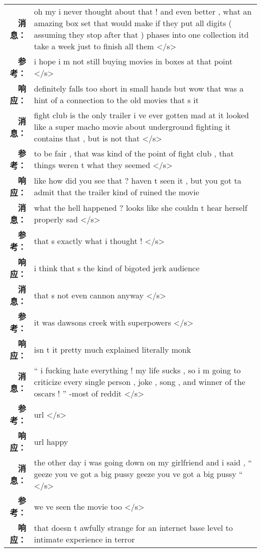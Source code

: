 \begin{tabularx}{\textwidth}{@{}rX@{}}%
\toprule%
\midrule%
\textbf{消息：}&oh my i never thought about that ! and even better , what an amazing box set that would make if they put all digits ( assuming they stop after that ) phases into one collection itd take a week just to finish all them </s>\\%
\textbf{参考：}&i hope i m not still buying movies in boxes at that point </s>\\%
\textbf{响应：}&definitely falls too short in small hands but wow that was a hint of a connection to the old movies that s it\\%
\midrule%
\textbf{消息：}&fight club is the only trailer i ve ever gotten mad at it looked like a super macho movie about underground fighting it contains that , but is not that </s>\\%
\textbf{参考：}&to be fair , that was kind of the point of fight club , that things weren t what they seemed </s>\\%
\textbf{响应：}&like how did you see that ? haven t seen it , but you got ta admit that the trailer kind of ruined the movie\\%
\midrule%
\textbf{消息：}&what the hell happened ? looks like she couldn t hear herself properly sad </s>\\%
\textbf{参考：}&that s exactly what i thought ! </s>\\%
\textbf{响应：}&i think that s the kind of bigoted jerk audience\\%
\midrule%
\textbf{消息：}&that s not even cannon anyway </s>\\%
\textbf{参考：}&it was dawsons creek with superpowers </s>\\%
\textbf{响应：}&isn t it pretty much explained literally monk\\%
\midrule%
\textbf{消息：}&`` i fucking hate everything ! my life sucks , so i m going to criticize every single person , joke , song , and winner of the oscars ! '' {-}most of reddit </s>\\%
\textbf{参考：}&url </s>\\%
\textbf{响应：}&url happy\\%
\midrule%
\textbf{消息：}&the other day i was going down on my girlfriend and i said , `` geeze you ve got a big pussy geeze you ve got a big pussy `` </s>\\%
\textbf{参考：}&we ve seen the movie too </s>\\%
\textbf{响应：}&that doesn t awfully strange for an internet base level to intimate experience in terror\\%

\end{tabularx}
